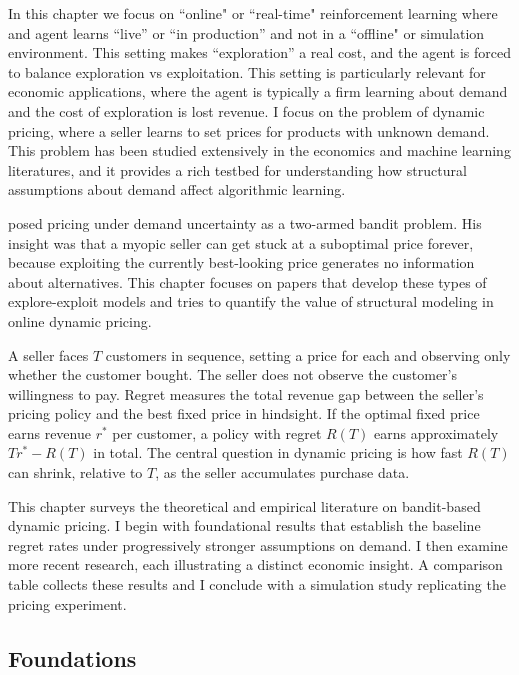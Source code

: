 In this chapter we focus on ``online" or ``real-time" reinforcement learning where and agent learns ``live'' or ``in production'' and not in a ``offline" or simulation environment. This setting makes ``exploration'' a real cost, and the agent is forced to balance exploration vs exploitation. This setting is particularly relevant for economic applications, where the agent is typically a firm learning about demand and the cost of exploration is lost revenue. I focus on the problem of dynamic pricing, where a seller learns to set prices for products with unknown demand. This problem has been studied extensively in the economics and machine learning literatures, and it provides a rich testbed for understanding how structural assumptions about demand affect algorithmic learning. 

\citet{Rothschild1974} posed pricing under demand uncertainty as a two-armed bandit problem. His insight was that a myopic seller can get stuck at a suboptimal price forever, because exploiting the currently best-looking price generates no information about alternatives. This chapter focuses on papers that develop these types of explore-exploit models and tries to quantify the value of structural modeling in online dynamic pricing. 

A seller faces $T$ customers in sequence, setting a price for each and observing only whether the customer bought. The seller does not observe the customer's willingness to pay. Regret measures the total revenue gap between the seller's pricing policy and the best fixed price in hindsight. If the optimal fixed price earns revenue $r^*$ per customer, a policy with regret $R(T)$ earns approximately $T r^* - R(T)$ in total. The central question in dynamic pricing is how fast $R(T)$ can shrink, relative to $T$, as the seller accumulates purchase data.

This chapter surveys the theoretical and empirical literature on bandit-based dynamic pricing. I begin with foundational results that establish the baseline regret rates under progressively stronger assumptions on demand. I then examine more recent research, each illustrating a distinct economic insight. A comparison table collects these results and I conclude with a simulation study replicating the \citet{Misra2019} pricing experiment.

\subsection{Foundations}
\label{sec:dp_foundations}

